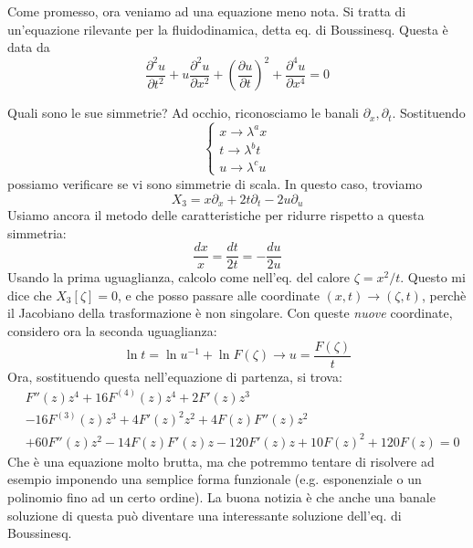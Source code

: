 \documentclass{report}
\begin{document}
\begin{example}
    Come promesso, ora veniamo ad una equazione meno nota. Si tratta di un'equazione rilevante per la fluidodinamica, detta eq. di Boussinesq. Questa è data da 
    \begin{equation}
        \frac{\partial^2 u}{\partial t^2} + u\frac{\partial^2 u}{\partial x^2} + \left(\frac{\partial u}{\partial t} \right)^2 + \frac{\partial^4 u}{\partial x^4} = 0 
    \end{equation}

    Quali sono le sue simmetrie? Ad occhio, riconosciamo le banali $\partial_x, \partial_t$. Sostituendo 
    \[\begin{cases}
        x \rightarrow \lambda^ax \\ t \rightarrow \lambda^bt \\ u \rightarrow \lambda^cu 
    \end{cases}\]
    possiamo verificare se vi sono simmetrie di scala. In questo caso, troviamo 
    \begin{equation}
        X_3 = x\partial_x + 2t\partial_t - 2u\partial_u
    \end{equation}
    Usiamo ancora il metodo delle caratteristiche per ridurre rispetto a questa simmetria: 
    \begin{equation}
        \frac{dx}{x} = \frac{dt}{2t} = -\frac{du}{2u}
    \end{equation}
    Usando la prima uguaglianza, calcolo come nell'eq. del calore $\zeta = x^2/t$. Questo mi dice che $X_3[\zeta] = 0$, e che posso passare alle coordinate $(x, t) \rightarrow (\zeta, t)$, perchè il Jacobiano della trasformazione è non singolare. Con queste \emph{nuove} coordinate, considero ora la seconda uguaglianza: 
    \begin{equation}
        \ln{t} = \ln{u^{-1}} + \ln{F(\zeta)} \rightarrow u = \frac{F(\zeta)}{t}
    \end{equation}
    Ora, sostituendo questa nell'equazione di partenza, si trova: 
    \begin{align*}
        & F''(z) z^{4} + 16 F^{(4)}(z) z^{4} + 2 F'(z) z^{3} \\ & - 16 F^{(3)}(z) z^{3}
        + 4 {F'(z)}^{2} z^{2} + 4 F(z) F''(z) z^{2} \\ &+ 60 F''(z) z^{2}
        - 14 F(z) F'(z) z - 120 F'(z) z + 10 F(z)^{2} + 120 F(z) = 0
    \end{align*}
    Che è una equazione molto brutta, ma che potremmo tentare di risolvere ad esempio imponendo una semplice forma funzionale (e.g. esponenziale o un polinomio fino ad un certo ordine). La buona notizia è che anche una banale soluzione di questa può diventare una interessante soluzione dell'eq. di Boussinesq. 
\end{example}
\end{document}
